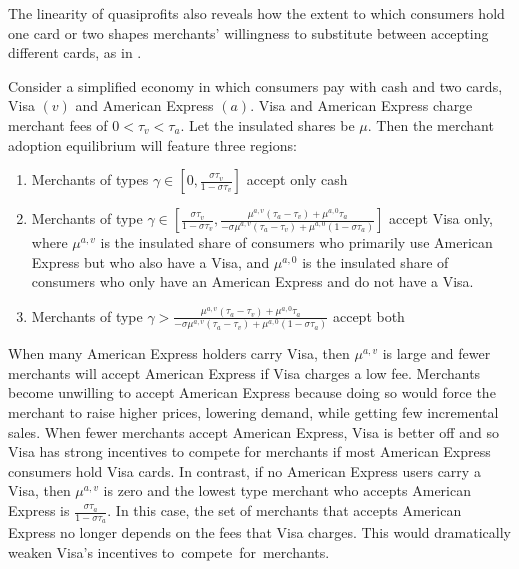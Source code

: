 The linearity of quasiprofits also reveals how the extent to which consumers hold one card or two shapes merchants' willingness to substitute between accepting different cards, as in \parencite{Rochet.Tirole2003}.

Consider a simplified economy in which consumers pay with cash and two cards, Visa $\left(v\right)$ and American Express $\left(a\right)$.
Visa and American Express charge merchant fees of $0<\tau_{v}<\tau_{a}$.
Let the insulated shares be $\mu$.
Then the merchant adoption equilibrium will feature three regions: \begin{enumerate} \item Merchants of types $\gamma\in\left[0,\frac{\sigma\tau_{v}}{1-\sigma\tau_{v}}\right]$ accept only cash \item Merchants of type $\gamma\in\left[\frac{\sigma\tau_{v}}{1-\sigma\tau_{v}},\frac{\mu^{a,v}\left(\tau_{a}-\tau_{v}\right)+\mu^{a,0}\tau_{a}}{-\sigma\mu^{a,v}\left(\tau_{a}-\tau_{v}\right)+\mu^{a,0}\left(1-\sigma\tau_{a}\right)}\right]$ accept Visa only, where $\mu^{a,v}$ is the insulated share of consumers who primarily use American Express but who also have a Visa, and $\mu^{a,0}$ is the insulated share of consumers who only have an American Express and do not have a Visa. \item Merchants of type $\gamma>\frac{\mu^{a,v}\left(\tau_{a}-\tau_{v}\right)+\mu^{a,0}\tau_{a}}{-\sigma\mu^{a,v}\left(\tau_{a}-\tau_{v}\right)+\mu^{a,0}\left(1-\sigma\tau_{a}\right)}$ accept both \end{enumerate}
When many American Express holders carry Visa, then $\mu^{a,v}$ is large and fewer merchants will accept American Express if Visa charges a low fee.
Merchants become unwilling to accept American Express because doing so would force the merchant to raise higher prices, lowering demand, while getting few incremental sales.
When fewer merchants accept American Express, Visa is better off and so Visa has strong incentives to compete for merchants if most American Express consumers hold Visa cards.
In contrast, if no American Express users carry a Visa, then $\mu^{a,v}$ is zero and the lowest type merchant who accepts American Express is $\frac{\sigma\tau_{a}}{1-\sigma\tau_{a}}$.
In this case, the set of merchants that accepts American Express no longer depends on the fees that Visa charges.
This would dramatically weaken Visa's incentives to~compete~for~merchants.
